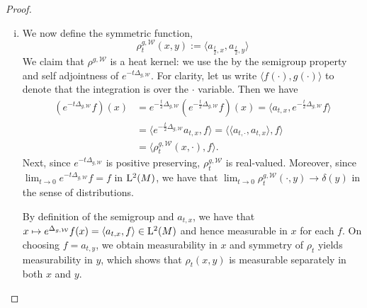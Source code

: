 \documentclass[a4paper, 12pt]{amsart}
\numberwithin{equation}{section}
\renewcommand{\~}{\tilde}
\renewcommand{\-}{\bar}
\newcommand{\8}{\infty}
\newcommand{\cW}{\mathcal{W}}
\newcommand{\mdot}{\cdotp}
\newcommand{\inprod}[1]{\langle #1 \rangle}	%
\newcommand{\Lp}[2][{}]{{\rm L}^{#2}_{\rm #1}}		%
\newcommand{\hk}{\rho}
\begin{document}
\begin{proof}
\begin{enumerate}[(i)]
\item We now define the symmetric function,
  $$\hk^{g,\cW}_t(x,y) := \inprod{a_{\frac{t}{2}, x}, a_{\frac{t}{2}, y}}$$
        We claim that \(\hk^{g,\cW}\) is a heat kernel: we use the by the semigroup property and self adjointness of \(e^{-t\Delta_{g,\cW}}\). For clarity, let us write \(\inprod{f(\cdot), g(\cdot)}\) to denote that the integration is over the \(\cdot\) variable. Then we have
	\[
        \begin{split}
        (e^{-t \Delta_{g,\cW}}f) (x) &= e^{-\frac{t}{2} \Delta_{g,\cW}} (e^{-\frac{t}{2} \Delta_{g,\cW}} f) (x) = \inprod{a_{t,x}, e^{-\frac{t}{2} \Delta_{g,\cW}} f} \\
        &= \inprod{e^{-\frac{t}{2} \Delta_{g,\cW}} a_{t,x}, f} = \inprod{\inprod{a_{t,\cdot}, a_{t,x}}, f} \\
        &= \inprod{\hk^{g,\cW}_t(x,\cdot), f}.
        \end{split}
        \]
        Next, since $e^{-t \Delta_{g,\cW}}$	is positive preserving, $\hk_t^{g,\cW}$ is real-valued. Moreover, since $\lim_{t\to 0} e^{-t\Delta_{g,\cW}}f = f$ in $\Lp{2}(M)$, we have that $\lim_{t \to 0} \hk^{g,\cW}_t(\mdot,y) \to  \delta(y)$ in the sense of distributions.

        By definition of the semigroup and $a_{t,x}$, we have that $x\mapsto e^{\Delta_{g,\cW}}f(x) = \inprod{a_{t,x},f} \in \Lp{2}(M)$
	and hence measurable in $x$ for each $f$. 
	On choosing \(f = a_{t,y}\), we obtain 
	measurability in \(x\) and symmetry of \(\rho_t\) yields measurability in \(y\),
	which shows that \(\rho_t(x, y)\) is measurable separately in both \(x\) and \(y\). 


\end{enumerate}
\end{proof}
\end{document}

